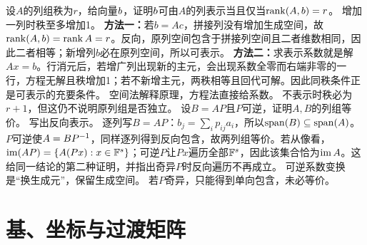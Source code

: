 {设$A$的列组秩为$r$，给向量$b$，证明$b$可由$A$的列表示当且仅当$\operatorname{rank}(A,b)=r$。}
{增加一列时秩至多增加1。}
{\textbf{方法一：}若$b=Ac$，拼接列没有增加生成空间，故$\operatorname{rank}(A,b)=\operatorname{rank} A=r$。反向，原列空间包含于拼接列空间且二者维数相同，因此二者相等；新增列$b$必在原列空间，所以可表示。
\textbf{方法二：}求表示系数就是解$Ax=b$。行消元后，若增广列出现新的主元，会出现系数全零而右端非零的一行，方程无解且秩增加1；若不新增主元，两秩相等且回代可解。因此同秩条件正是可表示的充要条件。}
{空间法解释原理，方程法直接给系数。}
{不表示时秩必为$r+1$，但这仍不说明原列组是否独立。}
{设$B=AP$且$P$可逆，证明$A,B$的列组等价。}
{写出反向表示。}
{逐列写$B=AP$：$b_j=\sum_i p_{ij}a_i$，所以$\operatorname{span}(B)\subseteq\operatorname{span}(A)$。$P$可逆使$A=BP^{-1}$，同样逐列得到反向包含，故两列组等价。若从像看，$\operatorname{im}(AP)=\{A(Px):x\in\mathbb{F}^s\}$；可逆$P$让$Px$遍历全部$\mathbb{F}^s$，因此该集合恰为$\operatorname{im} A$。这给同一结论的第二种证明，并指出奇异$P$时反向遍历不再成立。}
{可逆系数变换是“换生成元”，保留生成空间。}
{若$P$奇异，只能得到单向包含，未必等价。}
\section{基、坐标与过渡矩阵}
